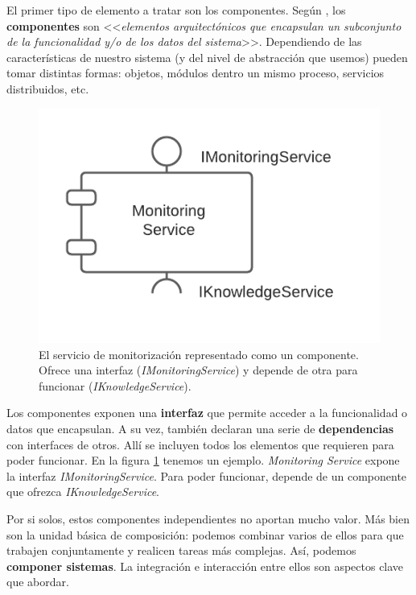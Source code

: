 El primer tipo de elemento a tratar son los componentes. Según \cite{taylorSoftwareArchitectureFoundations2009}, los \textbf{componentes} son <<\emph{elementos arquitectónicos que encapsulan un subconjunto de la funcionalidad y/o de los datos del sistema}>>. Dependiendo de las características de nuestro sistema (y del nivel de abstracción que usemos) pueden tomar distintas formas: objetos, módulos dentro un mismo proceso, servicios distribuidos, etc.

\begin{figure}
  \centering
  \includegraphics[scale=0.8]{cap_contexto_tecnologico/images/componente-ejemplo}
  \caption{El servicio de monitorización representado como un componente. Ofrece una interfaz (\emph{IMonitoringService}) y depende de otra para funcionar (\emph{IKnowledgeService}).}
  \label{fig:componenteEjemplo}
\end{figure}

Los componentes exponen una \textbf{interfaz} que permite acceder a la funcionalidad o datos que encapsulan. A su vez, también declaran una serie de \textbf{dependencias} con interfaces de otros. Allí se incluyen todos los elementos que requieren para poder funcionar. En la figura \ref{fig:componenteEjemplo} tenemos un ejemplo. \emph{Monitoring Service} expone la interfaz \emph{IMonitoringService}. Para poder funcionar, depende de un componente que ofrezca \emph{IKnowledgeService}.

Por si solos, estos componentes independientes no aportan mucho valor. Más bien son la unidad básica de composición: podemos combinar varios de ellos para que trabajen conjuntamente y realicen tareas más complejas. Así, podemos \textbf{componer sistemas}. \cite{mehtaTaxonomySoftwareConnectors2000} La integración e interacción entre ellos son aspectos clave que abordar.

